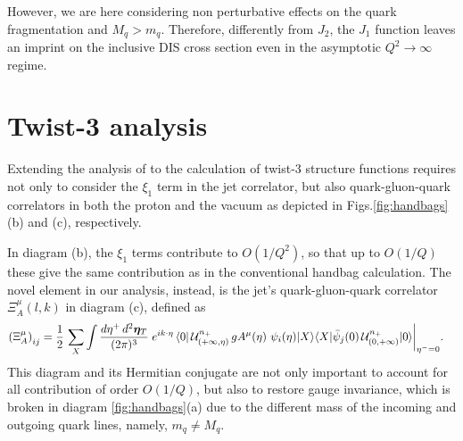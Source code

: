 \documentclass[preprintnumbers,floatfix,nofootinbib]{revtex4}
\newcommand{\todo}[1]{\marginpar{$\bullet$}\textbf{#1}}
\newcommand{\Tr}{\operatorname*{Tr}\nolimits} %
\newcommand{\de}{d}                    %
\newcommand{\ii}{i}                    %
\newcommand{\mj}{M_q}
\newcommand{\mq}{m_q}
\begin{document}
However, we are here considering non perturbative effects
on the quark fragmentation and $\mj > \mq$. 
Therefore, differently from $J_2$, the $J_1$ function leaves an imprint on the inclusive DIS cross section even in the asymptotic $Q^2 \to \infty$ regime. 


\section{Twist-3 analysis}

Extending the analysis of \cite{Accardi:2008ne} to the calculation of twist-3
structure functions requires not only to consider the $\xi_1$ term in the jet
correlator, but also quark-gluon-quark correlators in both the proton and the
vacuum as depicted in Figs.\ref{fig:handbags}(b) and (c), respectively. 

In diagram (b), the $\xi_1$ terms contribute to $O(1/Q^2)$, so that up to $O(1/Q)$ these give the same contribution as in the conventional handbag calculation. The novel element in our analysis, instead, is the jet's quark-gluon-quark correlator $\Xi_A^{\mu}(l,k)$ in diagram (c), defined as 
\begin{equation} 
\begin{split} 
  \left(\Xi_A^{\mu} \right)_{ij} &=
   \frac{1}{2}\, \sum_X \int \frac{\de \eta^+\, \de^2 \bm{\eta}_T}{(2\pi)^{3}}\;
   e^{\ii k \cdot \eta}\,
   \langle 0|\,
   {\cal U}^{n_+}_{(+\infty,\eta)}\,
   g A^{\mu}(\eta)\,
   \,\psi_i(\eta)|X\rangle
   \langle X|
             \bar{\psi}_j(0)\,
   {\cal U}^{n_+}_{(0,+\infty)}
   |0\rangle \bigg|_{\eta^-=0} .
\label{e:xi_A}
\end{split} 
\end{equation}  
This diagram and its Hermitian conjugate are not only important to account for
all contribution of order $O(1/Q)$, but also to restore gauge invariance, which is broken in diagram \ref{fig:handbags}(a) due to the different mass
of the incoming and outgoing quark lines, namely, $\mq \neq \mj$. 
\end{document}
